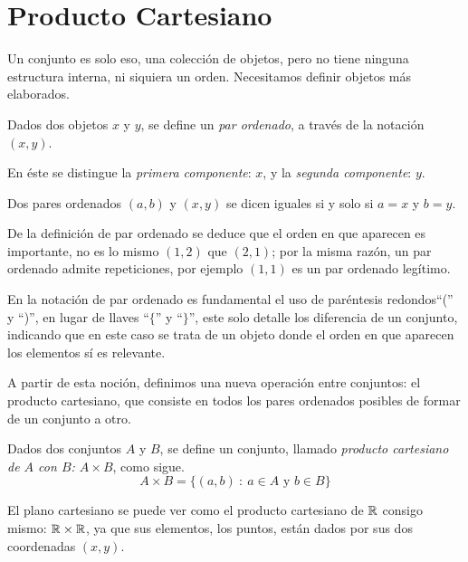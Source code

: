 
\section{Producto Cartesiano}

Un conjunto es solo eso, una colección de objetos, pero no tiene ninguna estructura interna, ni siquiera un orden.
Necesitamos definir objetos más elaborados.

\vspace{.2cm}

\begin{defn}
Dados dos objetos  $x$ y $y$, se define un \emph{par ordenado}, a través de la notación $(x,y)$.

En éste se distingue la \emph{primera componente}: $x$, y la \emph{segunda componente}: $y$.

Dos pares ordenados $(a,b)$ y $(x,y)$ se dicen iguales si y solo si $a=x$ y $b=y$.
\end{defn}

De la definición de par ordenado se deduce que el orden en que aparecen es importante, no es lo mismo $(1,2)$ que $(2,1)$; por la misma razón, un par ordenado admite repeticiones, por ejemplo $(1,1)$ es un par ordenado legítimo.

En la notación de par ordenado es fundamental el uso de paréntesis redondos``('' y ``)'', en lugar de llaves ``$\{$'' y ``$\}$'', este solo detalle los diferencia de un conjunto, indicando que en este caso se trata de un objeto donde el orden en que aparecen los elementos sí es relevante.

A partir de esta noción, definimos una nueva operación entre conjuntos: el producto cartesiano, que consiste en todos los pares ordenados posibles de formar de un conjunto a otro.

\vspace{.2cm}


\begin{defn}
Dados dos conjuntos $A$ y $B$, se define un conjunto, llamado \emph{producto cartesiano de $A$ con $B$: $A\times B$}, como sigue.
$$A\times B=\{(a,b)\ :\ a\in A\textrm{ y } b\in B\}$$
\end{defn}


\begin{ejemplo}
El plano cartesiano se puede ver como el producto cartesiano de $\mathbb{R}$ consigo mismo: $\mathbb{R}\times \mathbb{R}$, ya que sus elementos, los puntos, están dados por sus dos coordenadas $(x,y)$.
\end{ejemplo}

